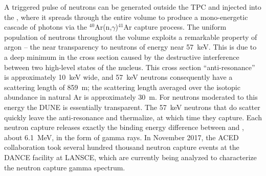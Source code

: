 A triggered pulse of neutrons can be generated outside the TPC and injected into the , where it spreads through the entire volume to produce a mono-energetic cascade of photons via the $^{40}$Ar(n,$\gamma$)$^{41}$Ar capture process. The uniform population of neutrons throughout the  volume exploits a remarkable property of argon -- the near transparency to neutrons of energy near \SI{57}{\keV}. 
This is due to a deep minimum in the cross section caused by the destructive interference between two high-level states of the  nucleus. This cross section ``anti-resonance'' is approximately  \SI{10}{\keV} wide, and \SI{57}{keV} neutrons consequently have a scattering length of \SI{859}{m}; the scattering length averaged over the isotopic abundance in natural Ar is approximately \SI{30}{m}. 
For neutrons moderated to this energy the DUNE  is essentially transparent. The \SI{57}{keV} neutrons that do scatter quickly leave the anti-resonance and thermalize, at which time they capture. Each neutron capture releases exactly the binding energy difference between  and , about \SI{6.1}{\MeV}, in the form of gamma rays. 
In November 2017, the ACED~\cite{aced-svoboda} collaboration took several hundred thousand neutron capture events at the DANCE\cite{Reifarth:2013xny} facility at LANSCE, which are currently being analyzed to characterize the neutron capture gamma spectrum. 


